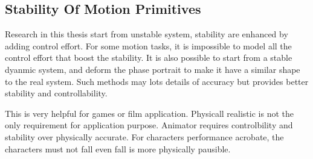 \subsection{Stability Of Motion Primitives}

Research in this thesis start from   unstable system,  stability are enhanced by adding control effort.
For some motion tasks, it is impossible to model all the control effort that boost the stability.
It is also possible to start from a stable dyanmic system, and deform the phase portrait to make it have a similar shape to the real system.
Such methods may lots details of accuracy but provides better stability and controllability. 

This is very helpful for games or film application.
Physicall realistic is not the only requirement for application purpose.
Animator requires controlbility and stability over physically accurate.
For characters performance acrobate, the characters must not fall even fall is more physically pausible.




